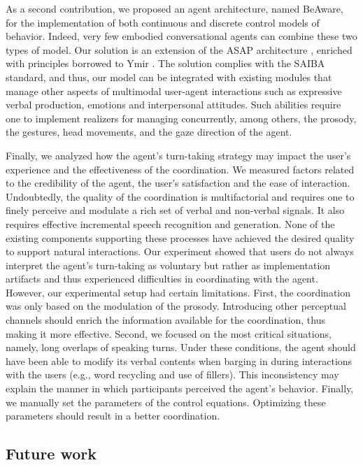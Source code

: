 \documentclass[twocolumn]{svjour3}
\begin{document}
As a second contribution, we proposed an agent architecture, named BeAware, for the implementation of both continuous and discrete control models of behavior. 
Indeed, very few embodied conversational agents can combine these two types of model. 
Our solution is an extension of the ASAP architecture \cite{kopp_architecture_2014}, enriched with principles borrowed to Ymir \citep{thorisson_mind_1999}. 
The solution complies with the SAIBA standard, and thus, our model can be integrated with existing modules that manage other aspects of multimodal user-agent interactions such as expressive verbal production, emotions and interpersonal attitudes. Such abilities require one to implement realizers for managing concurrently, among others, the prosody, the gestures, head movements, and the gaze direction of the agent.

Finally, we analyzed how the agent's turn-taking strategy may impact the user's experience and the effectiveness of the coordination.
We measured factors related to the credibility of the agent, the user's satisfaction and the ease of interaction.  
Undoubtedly, the quality of the coordination is multifactorial and requires one to finely perceive and modulate a rich set of verbal and non-verbal signals. It also requires effective incremental speech recognition and generation. None of the existing components supporting these processes have achieved the desired quality to support natural interactions. Our experiment showed that users do not always interpret the agent's turn-taking as voluntary but rather as implementation artifacts and thus experienced difficulties in coordinating with the agent. 
However, our experimental setup had certain limitations. 
First, the coordination was only based on the modulation of the prosody. Introducing other perceptual channels should enrich the information available for the coordination, thus making it more effective.
Second, we focused on the most critical situations, namely, long overlaps of speaking turns. Under these conditions, the agent should have been able to modify its verbal contents when barging in during interactions with the users (e.g., word recycling and use of fillers). This inconsistency may explain the manner in which participants perceived the agent's behavior. 
Finally, we manually set the parameters of the control equations. Optimizing these parameters should result in a better coordination. 

\subsection{Future work}
\end{document}
